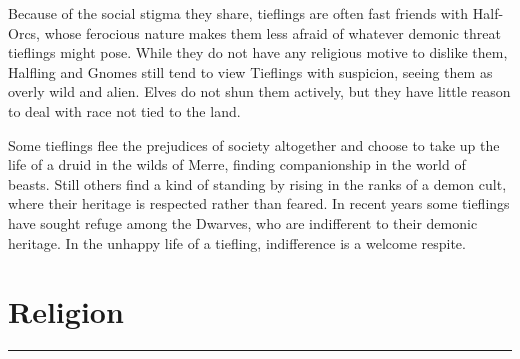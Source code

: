\documentclass[paper=a4, fontsize=11pt]{scrartcl} %
\newcommand{\horrule}[1]{\rule{\linewidth}{#1}} %
\begin{document}
\begin{multicols}{2}
Because of the social stigma they share, tieflings are often fast friends with Half-Orcs, whose ferocious nature makes them less afraid of whatever demonic threat tieflings might pose. While they do not have any religious motive to dislike them, Halfling and Gnomes still tend to view Tieflings with suspicion, seeing them as overly wild and alien. Elves do not shun them actively, but they have little reason to deal with race not tied to the land. 

Some tieflings flee the prejudices of society altogether and choose to take up the life of a druid in the wilds of Merre, finding companionship in the world of beasts. Still others find a kind of standing by rising in the ranks of a demon cult, where their heritage is respected rather than feared. In recent years some tieflings have sought refuge among the Dwarves, who are indifferent to their demonic heritage. In the unhappy life of a tiefling, indifference is a welcome respite.

\end{multicols}

\pagebreak

\section{Religion}

\horrule{0.5pt} \\[0.4cm] %
\end{document}
